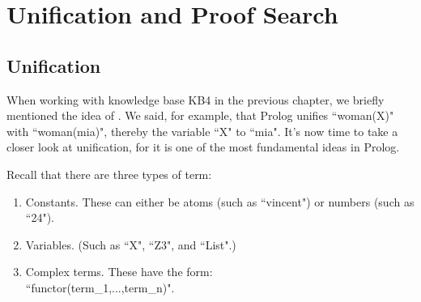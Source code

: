 

\chapter{Unification and Proof Search}\label{CHAPTER2}

\section{Unification}\label{SEC.L2.UNIFICATION}



When working with knowledge base KB4 in the previous chapter, we
briefly mentioned the idea of . We said, for
example, that Prolog unifies ``woman(X)" with ``woman(mia)", thereby
 the variable ``X" to ``mia". It's now time to take a
closer look at unification, for it is one of the most fundamental
ideas in Prolog.

Recall that there are three types of term:

\begin{enumerate}
\item{}Constants. These can either be atoms (such as ``vincent") or numbers
(such as ``24").
\item{}Variables. (Such as ``X", ``Z3", and ``List".)
\item{}Complex terms. These have the form:\\ ``functor(term\_1,...,term\_n)".
\end{enumerate}

